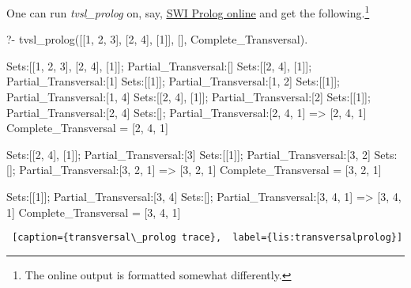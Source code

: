 One can run \textit{tvsl\_prolog} on, say, \href{https://swish.swi-prolog.org/}{\underline{SWI Prolog online}} and get the following.\footnote{The online output is formatted somewhat differently.}

\begin{minipage}{\linewidth} \largev \hrulefill
\begin{python}
?- tvsl_prolog([[1, 2, 3], [2, 4], [1]], [], Complete_Transversal).

Sets:[[1, 2, 3], [2, 4], [1]]; Partial_Transversal:[]
Sets:[[2, 4], [1]]; Partial_Transversal:[1]
Sets:[[1]]; Partial_Transversal:[1, 2]
Sets:[[1]]; Partial_Transversal:[1, 4]
Sets:[[2, 4], [1]]; Partial_Transversal:[2]
Sets:[[1]]; Partial_Transversal:[2, 4]
Sets:[]; Partial_Transversal:[2, 4, 1]
 => [2, 4, 1]
 Complete_Transversal = [2, 4, 1]

Sets:[[2, 4], [1]]; Partial_Transversal:[3]
Sets:[[1]]; Partial_Transversal:[3, 2]
Sets:[]; Partial_Transversal:[3, 2, 1]
 => [3, 2, 1]
 Complete_Transversal = [3, 2, 1]

Sets:[[1]]; Partial_Transversal:[3, 4]
Sets:[]; Partial_Transversal:[3, 4, 1]
 => [3, 4, 1]
 Complete_Transversal = [3, 4, 1]
\end{python}
\begin{lstlisting} [caption={transversal\_prolog trace},  label={lis:transversalprolog}]
\end{lstlisting}
\end{minipage}
